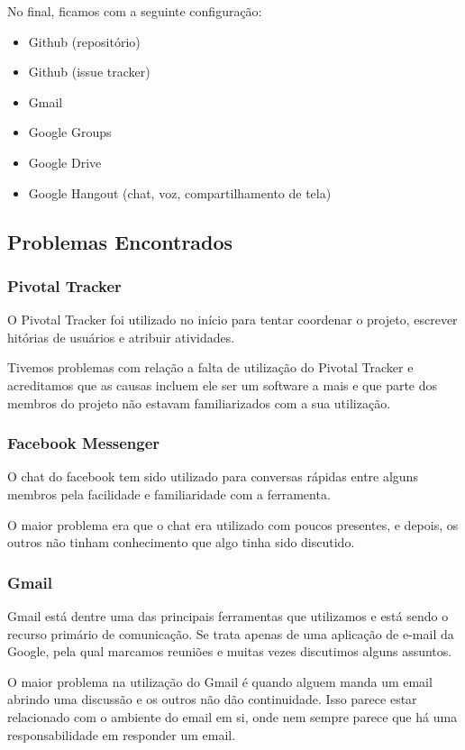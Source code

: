 \documentclass{acm_proc_article-sp}
\begin{document}
No final, ficamos com a seguinte configuração:

\begin{itemize}
  \item Github (repositório)
  \item Github (issue tracker)
  \item Gmail
  \item Google Groups
  \item Google Drive
  \item Google Hangout (chat, voz, compartilhamento de tela)
\end{itemize}

\subsection{Problemas Encontrados}
\subsubsection{Pivotal Tracker}
O Pivotal Tracker foi utilizado no início para tentar coordenar o projeto, escrever hitórias de usuários e atribuir atividades.

Tivemos problemas com relação a falta de utilização do Pivotal Tracker e acreditamos que
as causas incluem ele ser um software a mais e que parte dos membros do projeto não estavam familiarizados
com a sua utilização.

\subsubsection{Facebook Messenger}
O chat do facebook tem sido utilizado para conversas rápidas entre alguns membros pela facilidade e familiaridade com a ferramenta.

O maior problema era que o chat era utilizado com poucos presentes, e depois, os outros não tinham conhecimento
que algo tinha sido discutido.

\subsubsection{Gmail}
Gmail está dentre uma das principais ferramentas que utilizamos e está sendo o recurso primário de comunicação.
Se trata apenas de uma aplicação de e-mail da Google, pela qual marcamos reuniões e muitas vezes discutimos alguns assuntos.

O maior problema na utilização do Gmail é quando alguem manda um email abrindo uma discussão e os outros não dão continuidade.
Isso parece estar relacionado com o ambiente do email em si, onde nem sempre parece que há uma responsabilidade em responder um email.
\end{document}
